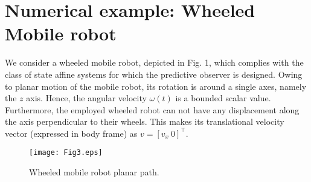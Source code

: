 \documentclass[12pt,draftcls,onecolumn]{IEEEtran}
\begin{document}
\section{Numerical example: Wheeled Mobile robot}

We consider a wheeled mobile robot, depicted in Fig. 1, which complies with the class of state affine systems for which the predictive observer is designed. 
Owing to planar motion of the mobile robot, its rotation is around a single axes, namely the $z$ axis. Hence, the angular velocity $ \omega (t) $ is a bounded scalar value. Furthermore, the employed wheeled robot can not have any displacement along the axis perpendicular to their wheels. This makes its translational velocity vector (expressed in body frame) as  $ v = [{v_x} ~ 0]^{\top} $.
\begin{figure}[thpb]  \label{F3}
\centering
\texttt{[image: Fig3.eps]}
\caption{Wheeled mobile robot planar path. }
\end{figure}
\end{document}
